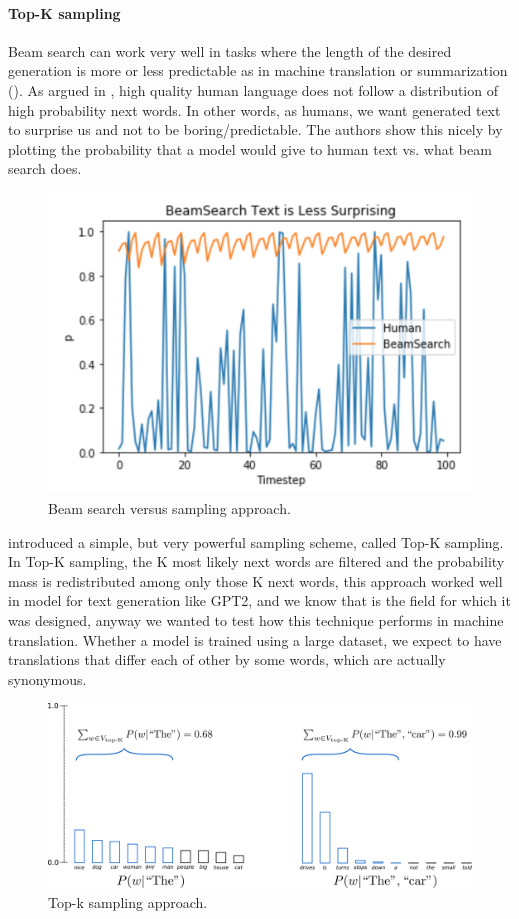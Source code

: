 \paragraph{Top-K sampling}
Beam search can work very well in tasks where the length of the desired generation is more or less predictable as in machine translation or summarization (\cite{yang2018breaking}). As argued in \cite{holtzman2019curious}, high quality human language does not follow a distribution of high probability next words. In other words, as humans, we want generated text to surprise us and not to be boring/predictable. The authors show this nicely by plotting the probability that a model would give to human text vs. what beam search does.

\begin{figure}[H]
    \centering
    \includegraphics[width = .68\linewidth]{images/beam_search_vs_top_k_sampling.png}
    \caption{Beam search versus sampling approach.}
    \label{fig:beam_search_vs_sampling}
\end{figure}

\cite{fan2018hierarchical} introduced a simple, but very powerful sampling scheme, called Top-K sampling. In Top-K sampling, the K most likely next words are filtered and the probability mass is redistributed among only those K next words, this approach worked well in model for text generation like GPT2, and we know that is the field for which it was designed, anyway we wanted to test how this technique performs in machine translation. Whether a model is trained using a large dataset, we expect to have translations that differ each of other by some words, which are actually synonymous.

\begin{figure}[H]
    \centering
    \includegraphics[width = .89\linewidth]{images/top_k_sampling.png}
    \caption{Top-k sampling approach.}
    \label{fig:topk_sampling}
\end{figure}

